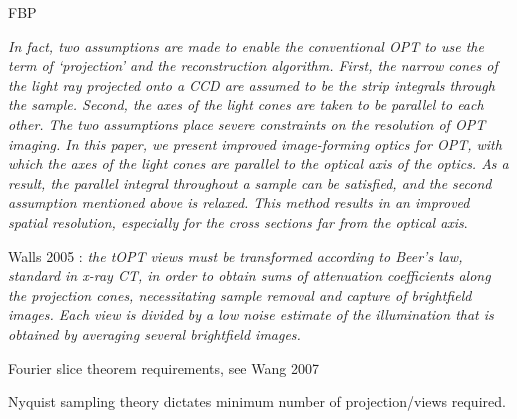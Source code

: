 \documentclass[12pt]{article}
\begin{document}
FBP









\textit{ In fact, two assumptions are made to enable the conventional OPT to use the term of ‘projection’ and the reconstruction algorithm. First, the narrow cones of the light ray projected onto a CCD are assumed to be the strip integrals through the sample. Second, the axes of the light cones are taken to be parallel to each other. The two assumptions place severe constraints on the resolution of OPT imaging. In this paper, we present improved image-forming optics for OPT, with which the axes of the light cones are parallel to the optical axis of the optics. As a result, the parallel integral throughout a sample can be satisfied, and the second assumption mentioned above is relaxed. This method results in an improved spatial resolution, especially for the cross sections far from the optical axis}. \cite{Wang:2006hy}


Walls 2005 \cite{Walls:2005ja} : \textit{the tOPT views must be transformed according to Beer’s law, standard in x-ray CT, in order to obtain sums of attenuation coefficients along the projection cones, necessitating sample removal and capture of brightfield images. Each view is divided by a low noise estimate of the illumination that is obtained by averaging several brightfield images.}

Fourier slice theorem requirements, see Wang 2007 \cite{Wang:2007}

Nyquist sampling theory dictates minimum number of projection/views required.
\end{document}
